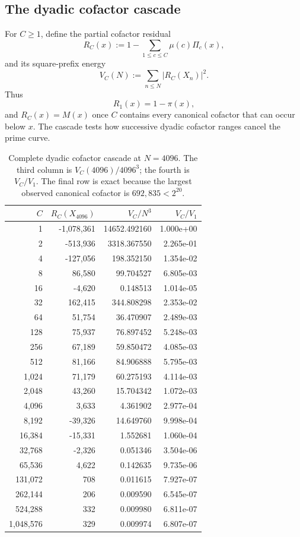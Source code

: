 \documentclass[11pt]{article}
\theoremstyle{definition}
\newcommand{\1}{\mathbf{1}}
\begin{document}
\subsection{The dyadic cofactor cascade}
\label{subsec:cofactor-cascade}

For $C\ge1$, define the partial cofactor residual
\begin{equation}
 R_C(x)
 :=
 1-\sum_{1\le c\le C}\mu(c)\Pi_c(x),
 \label{eq:R-C}
\end{equation}
and its square-prefix energy
\begin{equation}
 V_C(N)
 :=
 \sum_{n\le N}|R_C(X_n)|^2.
 \label{eq:V-C}
\end{equation}
Thus
\[
 R_1(x)=1-\pi(x),
\]
and $R_C(x)=M(x)$ once $C$ contains every canonical cofactor that can occur below $x$.  The cascade tests how successive dyadic cofactor ranges cancel the prime curve.

\begin{table}[htbp]
\centering
\caption{Complete dyadic cofactor cascade at $N=4096$.  The third column is $V_C(4096)/4096^3$; the fourth is $V_C/V_1$.  The final row is exact because the largest observed canonical cofactor is $692{,}835<2^{20}$.}
\label{tab:cofactor-cascade}
\scriptsize
\setlength{\tabcolsep}{7pt}
\begin{tabular}{rrrr}
\toprule
$C$ & $R_C(X_{4096})$ & $V_C/N^3$ & $V_C/V_1$\\
\midrule
1 & -1,078,361 & 14652.492160 & 1.000e+00 \\
2 & -513,936 & 3318.367550 & 2.265e-01 \\
4 & -127,056 & 198.352150 & 1.354e-02 \\
8 & 86,580 & 99.704527 & 6.805e-03 \\
16 & -4,620 & 0.148513 & 1.014e-05 \\
32 & 162,415 & 344.808298 & 2.353e-02 \\
64 & 51,754 & 36.470907 & 2.489e-03 \\
128 & 75,937 & 76.897452 & 5.248e-03 \\
256 & 67,189 & 59.850472 & 4.085e-03 \\
512 & 81,166 & 84.906888 & 5.795e-03 \\
1,024 & 71,179 & 60.275193 & 4.114e-03 \\
2,048 & 43,260 & 15.704342 & 1.072e-03 \\
4,096 & 3,633 & 4.361902 & 2.977e-04 \\
8,192 & -39,326 & 14.649760 & 9.998e-04 \\
16,384 & -15,331 & 1.552681 & 1.060e-04 \\
32,768 & -2,326 & 0.051346 & 3.504e-06 \\
65,536 & 4,622 & 0.142635 & 9.735e-06 \\
131,072 & 708 & 0.011615 & 7.927e-07 \\
262,144 & 206 & 0.009590 & 6.545e-07 \\
524,288 & 332 & 0.009980 & 6.811e-07 \\
1,048,576 & 329 & 0.009974 & 6.807e-07 \\
\bottomrule
\end{tabular}
\end{table}
\end{document}
